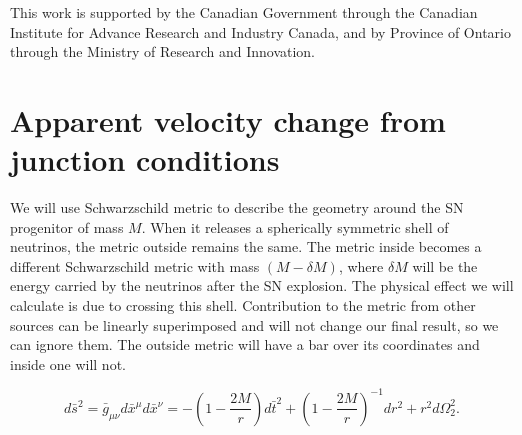 \documentclass[aps,showpacs,onecolumn,floats,prd,superscriptaddress,nofootinbib]{revtex4-1}
\begin{document}
\acknowledgments

This work is supported by the Canadian Government through the Canadian Institute for Advance Research and Industry Canada, and by Province of Ontario through the Ministry of Research and Innovation.

\appendix
\newpage
\section{Apparent velocity change from junction conditions}
\label{sec-junc}

We will use Schwarzschild metric to describe the geometry around the SN progenitor of mass $M$.
When it releases a spherically symmetric shell of neutrinos, the metric outside remains the same.
The metric inside becomes a different Schwarzschild metric with mass $(M-\delta M)$, where $\delta M$ will be the energy carried by the neutrinos after the SN explosion. 
The physical effect we will calculate is due to crossing this shell.
Contribution to the metric from other sources can be linearly superimposed and will not change our final result, so we can ignore them.
The outside metric will have a bar over its coordinates and inside one will not. 
 
\begin{equation}
	d\bar{s}^2 = \bar{g}_{\mu \nu} d\bar{x}^\mu d\bar{x}^\nu = - \left( 1 - \frac{2M}{r} \right) d\bar{t}^2 + \left( 1 - \frac{2M}{r} \right)^{-1} d {r}^2 + r^2 d {\Omega}_2^2. \label{SCH}
\end{equation}
\end{document}
